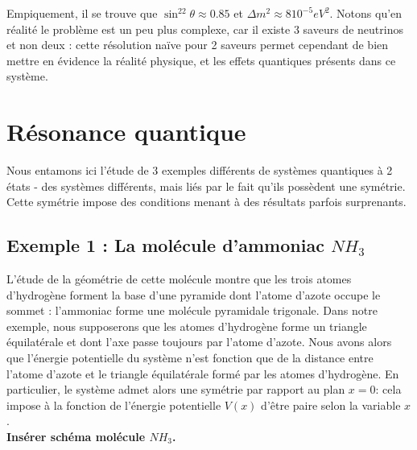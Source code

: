 \documentclass[../notesdecours.tex]{subfiles}
\begin{document}
Empiquement, il se trouve que $\sin^22\theta \approx 0.85$ et $\Delta m^2 \approx 8 10^{-5} eV^2$. Notons qu'en réalité le problème est un peu plus complexe, car il existe 3 saveurs de neutrinos et non deux : cette résolution naïve pour 2 saveurs permet cependant de bien mettre en évidence la réalité physique, et les effets quantiques présents dans ce système.



\section{Résonance quantique}

Nous entamons ici l'étude de 3 exemples différents de systèmes quantiques à 2 états - des systèmes différents, mais liés par le fait qu'ils possèdent une symétrie. Cette symétrie impose des conditions menant à des résultats parfois surprenants.

\subsection*{Exemple 1 : La molécule d'ammoniac $NH_3$}

L'étude de la géométrie de cette molécule montre que les trois atomes d'hydrogène forment la base d'une pyramide dont l'atome d'azote occupe le sommet : l'ammoniac forme une molécule pyramidale trigonale. Dans notre exemple, nous supposerons que les atomes d'hydrogène forme un triangle équilatérale et dont l'axe passe toujours par l'atome d'azote. Nous avons alors que l'énergie potentielle du système n'est fonction que de la distance entre l'atome d'azote et le triangle équilatérale formé par les atomes d'hydrogène. En particulier, le système admet alors une symétrie par rapport au plan $x = 0$: cela impose à la fonction de l'énergie potentielle $V(x)$ d'être paire selon la variable $x$.\\

\color{red} \textbf{Insérer schéma molécule $NH_3$.} \color{black}\\
\end{document}
